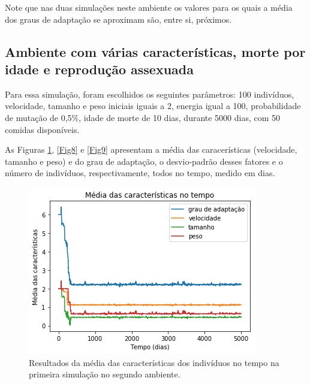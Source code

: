 \documentclass[10pt,brazil,english]{article}
\begin{document}
        Note que nas duas simulações neste ambiente os valores para os quais a média dos graus de adaptação se aproximam são, entre si, próximos.
        
        \subsection{Ambiente com várias características, morte por idade e reprodução assexuada}
        
        Para essa simulação, foram escolhidos os seguintes parâmetros: 100 indivíduos, velocidade, tamanho e peso iniciais iguais a 2, energia igual a 100, probabilidade de mutação de 0,5\%, idade de morte de 10 dias, durante  5000 dias, com 50 comidas disponíveis.
        
        As Figuras \ref{Fig7}, \ref{Fig8} e \ref{Fig9} apresentam a média das caracerísticas (velocidade, tamanho e peso) e do grau de adaptação, o desvio-padrão desses fatores e o número de indivíduos, respectivamente, todos no tempo, medido em dias.
        
        \begin{figure}[!hbtp]
            \begin{center}
                \includegraphics[scale=0.5]{Images/2-1.png}
            \end{center}
            \caption{Resultados da média das características dos indivíduos no tempo na primeira simulação no segundo ambiente.}
            \label{Fig7}
        \end{figure} 
        
\end{document}
